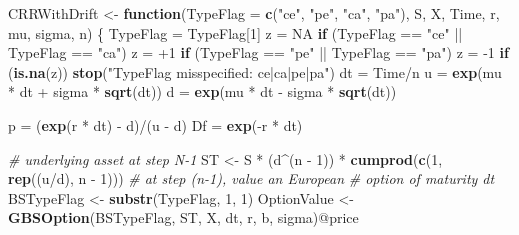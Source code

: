 \documentclass[justified]{tufte-book}
\newenvironment{Shaded}{}{}
\newcommand{\CommentTok}[1]{\textcolor[rgb]{0.38,0.63,0.69}{\textit{#1}}}
\newcommand{\ControlFlowTok}[1]{\textcolor[rgb]{0.00,0.44,0.13}{\textbf{#1}}}
\newcommand{\DataTypeTok}[1]{\textcolor[rgb]{0.56,0.13,0.00}{#1}}
\newcommand{\DecValTok}[1]{\textcolor[rgb]{0.25,0.63,0.44}{#1}}
\newcommand{\KeywordTok}[1]{\textcolor[rgb]{0.00,0.44,0.13}{\textbf{#1}}}
\newcommand{\NormalTok}[1]{#1}
\newcommand{\OperatorTok}[1]{\textcolor[rgb]{0.40,0.40,0.40}{#1}}
\newcommand{\OtherTok}[1]{\textcolor[rgb]{0.00,0.44,0.13}{#1}}
\newcommand{\StringTok}[1]{\textcolor[rgb]{0.25,0.44,0.63}{#1}}
\begin{document}
\begin{Shaded}
\begin{Highlighting}[]
\NormalTok{CRRWithDrift \textless{}{-}}\StringTok{ }\ControlFlowTok{function}\NormalTok{(}\DataTypeTok{TypeFlag =} \KeywordTok{c}\NormalTok{(}\StringTok{"ce"}\NormalTok{, }\StringTok{"pe"}\NormalTok{,}
    \StringTok{"ca"}\NormalTok{, }\StringTok{"pa"}\NormalTok{), S, X, Time, r, mu, sigma, n) \{}
\NormalTok{    TypeFlag =}\StringTok{ }\NormalTok{TypeFlag[}\DecValTok{1}\NormalTok{]}
\NormalTok{    z =}\StringTok{ }\OtherTok{NA}
    \ControlFlowTok{if}\NormalTok{ (TypeFlag }\OperatorTok{==}\StringTok{ "ce"} \OperatorTok{||}\StringTok{ }\NormalTok{TypeFlag }\OperatorTok{==}\StringTok{ "ca"}\NormalTok{)}
\NormalTok{        z =}\StringTok{ }\OperatorTok{+}\DecValTok{1}
    \ControlFlowTok{if}\NormalTok{ (TypeFlag }\OperatorTok{==}\StringTok{ "pe"} \OperatorTok{||}\StringTok{ }\NormalTok{TypeFlag }\OperatorTok{==}\StringTok{ "pa"}\NormalTok{)}
\NormalTok{        z =}\StringTok{ }\DecValTok{{-}1}
    \ControlFlowTok{if}\NormalTok{ (}\KeywordTok{is.na}\NormalTok{(z))}
        \KeywordTok{stop}\NormalTok{(}\StringTok{"TypeFlag misspecified: ce|ca|pe|pa"}\NormalTok{)}
\NormalTok{    dt =}\StringTok{ }\NormalTok{Time}\OperatorTok{/}\NormalTok{n}
\NormalTok{    u =}\StringTok{ }\KeywordTok{exp}\NormalTok{(mu }\OperatorTok{*}\StringTok{ }\NormalTok{dt }\OperatorTok{+}\StringTok{ }\NormalTok{sigma }\OperatorTok{*}\StringTok{ }\KeywordTok{sqrt}\NormalTok{(dt))}
\NormalTok{    d =}\StringTok{ }\KeywordTok{exp}\NormalTok{(mu }\OperatorTok{*}\StringTok{ }\NormalTok{dt }\OperatorTok{{-}}\StringTok{ }\NormalTok{sigma }\OperatorTok{*}\StringTok{ }\KeywordTok{sqrt}\NormalTok{(dt))}

\NormalTok{    p =}\StringTok{ }\NormalTok{(}\KeywordTok{exp}\NormalTok{(r }\OperatorTok{*}\StringTok{ }\NormalTok{dt) }\OperatorTok{{-}}\StringTok{ }\NormalTok{d)}\OperatorTok{/}\NormalTok{(u }\OperatorTok{{-}}\StringTok{ }\NormalTok{d)}
\NormalTok{    Df =}\StringTok{ }\KeywordTok{exp}\NormalTok{(}\OperatorTok{{-}}\NormalTok{r }\OperatorTok{*}\StringTok{ }\NormalTok{dt)}

    \CommentTok{\# underlying asset at step N{-}1}
\NormalTok{    ST \textless{}{-}}\StringTok{ }\NormalTok{S }\OperatorTok{*}\StringTok{ }\NormalTok{(d}\OperatorTok{\^{}}\NormalTok{(n }\OperatorTok{{-}}\StringTok{ }\DecValTok{1}\NormalTok{)) }\OperatorTok{*}\StringTok{ }\KeywordTok{cumprod}\NormalTok{(}\KeywordTok{c}\NormalTok{(}\DecValTok{1}\NormalTok{, }\KeywordTok{rep}\NormalTok{((u}\OperatorTok{/}\NormalTok{d),}
\NormalTok{        n }\OperatorTok{{-}}\StringTok{ }\DecValTok{1}\NormalTok{)))}
    \CommentTok{\# at step (n{-}1), value an European}
    \CommentTok{\# option of maturity dt}
\NormalTok{    BSTypeFlag \textless{}{-}}\StringTok{ }\KeywordTok{substr}\NormalTok{(TypeFlag, }\DecValTok{1}\NormalTok{, }\DecValTok{1}\NormalTok{)}
\NormalTok{    OptionValue \textless{}{-}}\StringTok{ }\KeywordTok{GBSOption}\NormalTok{(BSTypeFlag, ST, X,}
\NormalTok{        dt, r, b, sigma)}\OperatorTok{@}\NormalTok{price}


\end{Highlighting}
\end{Shaded}
\end{document}
